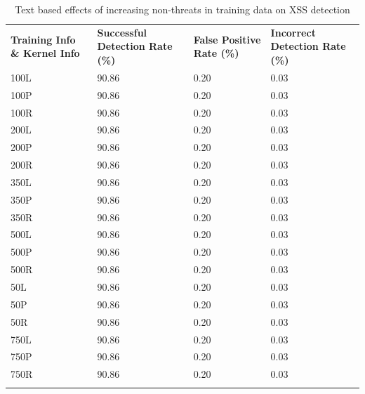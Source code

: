 \begin{appendices}
\begin{longtable}{|p{1.5in}|p{1in}|p{1in}|p{1in}|}
	\hline
	\textbf{Training Info \& Kernel Info} & \textbf{Successful Detection Rate (\%)} & \textbf{False Positive Rate (\%)} & \textbf{Incorrect Detection Rate (\%)}  \\
	\hhline{|=|=|=|=|}
 	100L & 90.86 & 0.20 & 0.03 \\ \hline
 	100P & 90.86 & 0.20 & 0.03 \\ \hline
 	100R & 90.86 & 0.20 & 0.03 \\ \hline
 	200L & 90.86 & 0.20 & 0.03 \\ \hline
 	200P & 90.86 & 0.20 & 0.03 \\ \hline
 	200R & 90.86 & 0.20 & 0.03 \\ \hline
 	350L & 90.86 & 0.20 & 0.03 \\ \hline
 	350P & 90.86 & 0.20 & 0.03 \\ \hline
 	350R & 90.86 & 0.20 & 0.03 \\ \hline
 	500L & 90.86 & 0.20 & 0.03 \\ \hline
 	500P & 90.86 & 0.20 & 0.03 \\ \hline
 	500R & 90.86 & 0.20 & 0.03 \\ \hline
  	50L & 90.86 & 0.20 & 0.03 \\ \hline
  	50P & 90.86 & 0.20 & 0.03 \\ \hline
  	50R & 90.86 & 0.20 & 0.03 \\ \hline
 	750L & 90.86 & 0.20 & 0.03 \\ \hline
 	750P & 90.86 & 0.20 & 0.03 \\ \hline
 	750R & 90.86 & 0.20 & 0.03 \\ \hline
 	\caption{Text based effects of increasing non-threats in training data on XSS detection}
\end{longtable}
	

\end{appendices}
